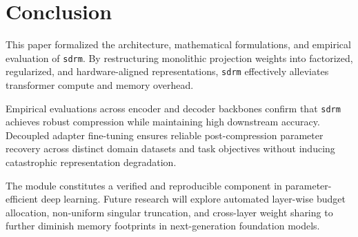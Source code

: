 \section{Conclusion}
This paper formalized the architecture, mathematical formulations, and empirical evaluation of \texttt{sdrm}. By restructuring monolithic projection weights into factorized, regularized, and hardware-aligned representations, \texttt{sdrm} effectively alleviates transformer compute and memory overhead.

Empirical evaluations across encoder and decoder backbones confirm that \texttt{sdrm} achieves robust compression while maintaining high downstream accuracy. Decoupled adapter fine-tuning ensures reliable post-compression parameter recovery across distinct domain datasets and task objectives without inducing catastrophic representation degradation.

The module constitutes a verified and reproducible component in parameter-efficient deep learning. Future research will explore automated layer-wise budget allocation, non-uniform singular truncation, and cross-layer weight sharing to further diminish memory footprints in next-generation foundation models.
